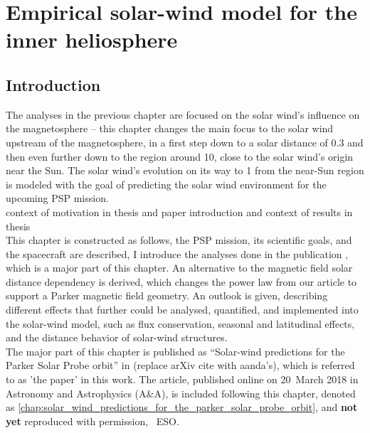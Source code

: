 
\chapter{Empirical solar-wind model for the inner heliosphere}
\label{chap:empirical_solar_wind_model_for_the_inner_heliosphere}

\section{Introduction}

The analyses in the previous chapter are focused on the solar wind's influence on the magnetosphere -- this chapter changes the main focus to the solar wind upstream of the magnetosphere, in a first step down to a solar distance of \SI{0.3}{\au} and then even further down to the region around \SI{10}{\Rs}, close to the solar wind's origin near the Sun. The solar wind's evolution on its way to \SI{1}{\au} from the near-Sun region is modeled with the goal of predicting the solar wind environment for the upcoming PSP mission.\\

context of motivation in thesis and paper introduction and context of results in thesis\\

This chapter is constructed as follows, the PSP mission, its scientific goals, and the spacecraft are described, I introduce the analyses done in the publication \citet{Venzmer2017}, which is a major part of this chapter. An alternative to the magnetic field solar distance dependency is derived, which changes the power law from our article to support a Parker magnetic field geometry. An outlook is given, describing different effects that further could be analysed, quantified, and implemented into the solar-wind model, such as flux conservation, seasonal and latitudinal effects, and the distance behavior of solar-wind structures.\\


The major part of this chapter is published as ``Solar-wind predictions for the Parker Solar Probe orbit'' in \citet{Venzmer2017} (replace arXiv cite with aanda's), which is referred to as 'the paper' in this work. The article, published online on 20~March 2018 in Astronomy and Astrophysics (A\&A), is included following this chapter, denoted as \autoref{chap:solar_wind_predictions_for_the_parker_solar_probe_orbit}, and \textbf{not yet} reproduced with permission, \textcopyright~ESO.

